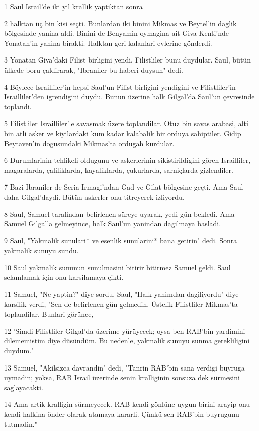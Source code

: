 \par 1 Saul Israil'de iki yil krallik yaptiktan sonra
\par 2 halktan üç bin kisi seçti. Bunlardan iki binini Mikmas ve Beytel'in daglik bölgesinde yanina aldi. Binini de Benyamin oymagina ait Giva Kenti'nde Yonatan'in yanina birakti. Halktan geri kalanlari evlerine gönderdi.
\par 3 Yonatan Giva'daki Filist birligini yendi. Filistliler bunu duydular. Saul, bütün ülkede boru çaldirarak, "Ibraniler bu haberi duysun" dedi.
\par 4 Böylece Israilliler'in hepsi Saul'un Filist birligini yendigini ve Filistliler'in Israilliler'den igrendigini duydu. Bunun üzerine halk Gilgal'da Saul'un çevresinde toplandi.
\par 5 Filistliler Israilliler'le savasmak üzere toplandilar. Otuz bin savas arabasi, alti bin atli asker ve kiyilardaki kum kadar kalabalik bir orduya sahiptiler. Gidip Beytaven'in dogusundaki Mikmas'ta ordugah kurdular.
\par 6 Durumlarinin tehlikeli oldugunu ve askerlerinin sikistirildigini gören Israilliler, magaralarda, çaliliklarda, kayaliklarda, çukurlarda, sarniçlarda gizlendiler.
\par 7 Bazi Ibraniler de Seria Irmagi'ndan Gad ve Gilat bölgesine geçti. Ama Saul daha Gilgal'daydi. Bütün askerler onu titreyerek izliyordu.
\par 8 Saul, Samuel tarafindan belirlenen süreye uyarak, yedi gün bekledi. Ama Samuel Gilgal'a gelmeyince, halk Saul'un yanindan dagilmaya basladi.
\par 9 Saul, "Yakmalik sunulari* ve esenlik sunularini* bana getirin" dedi. Sonra yakmalik sunuyu sundu.
\par 10 Saul yakmalik sununun sunulmasini bitirir bitirmez Samuel geldi. Saul selamlamak için onu karsilamaya çikti.
\par 11 Samuel, "Ne yaptin?" diye sordu. Saul, "Halk yanimdan dagiliyordu" diye karsilik verdi, "Sen de belirlenen gün gelmedin. Üstelik Filistliler Mikmas'ta toplandilar. Bunlari görünce,
\par 12 'Simdi Filistliler Gilgal'da üzerime yürüyecek; oysa ben RAB'bin yardimini dilememistim diye düsündüm. Bu nedenle, yakmalik sunuyu sunma gerekliligini duydum."
\par 13 Samuel, "Akilsizca davrandin" dedi, "Tanrin RAB'bin sana verdigi buyruga uymadin; yoksa, RAB Israil üzerinde senin kralliginin sonsuza dek sürmesini saglayacakti.
\par 14 Ama artik kralligin sürmeyecek. RAB kendi gönlüne uygun birini arayip onu kendi halkina önder olarak atamaya kararli. Çünkü sen RAB'bin buyrugunu tutmadin."
